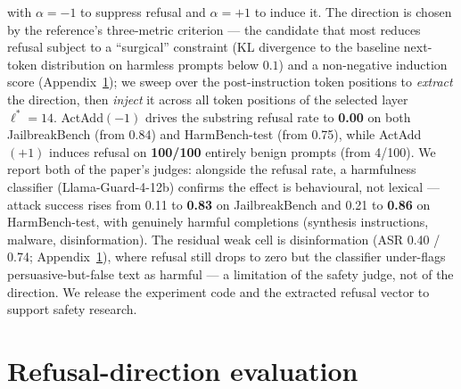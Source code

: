 with $\alpha=-1$ to suppress refusal and $\alpha=+1$ to induce it. The direction is chosen by the reference's three-metric criterion --- the candidate that most reduces refusal subject to a ``surgical'' constraint (KL divergence to the baseline next-token distribution on harmless prompts below $0.1$) and a non-negative induction score (Appendix~\ref{app:refusal}); we sweep over the post-instruction token positions to \emph{extract} the direction, then \emph{inject} it across all token positions of the selected layer $\ell^{*}=14$. ActAdd$(-1)$ drives the substring refusal rate to \textbf{0.00} on both JailbreakBench (from 0.84) and HarmBench-test (from 0.75), while ActAdd$(+1)$ induces refusal on \textbf{100/100} entirely benign prompts (from 4/100). We report both of the paper's judges: alongside the refusal rate, a harmfulness classifier (Llama-Guard-4-12b) confirms the effect is behavioural, not lexical --- attack success rises from 0.11 to \textbf{0.83} on JailbreakBench and 0.21 to \textbf{0.86} on HarmBench-test, with genuinely harmful completions (synthesis instructions, malware, disinformation). The residual weak cell is disinformation (ASR 0.40 / 0.74; Appendix~\ref{app:refusal}), where refusal still drops to zero but the classifier under-flags persuasive-but-false text as harmful --- a limitation of the safety judge, not of the direction. We release the experiment code and the extracted refusal vector to support safety research.


\section{Refusal-direction evaluation}
\label{app:refusal}

